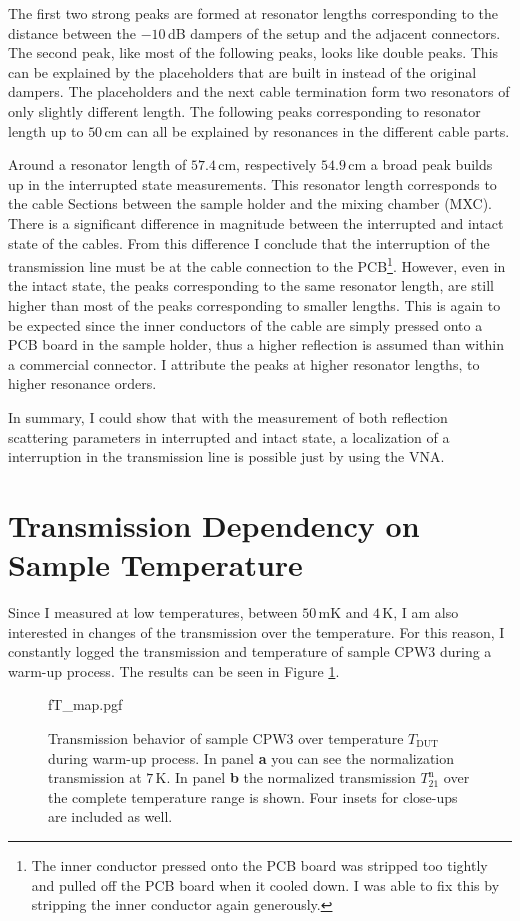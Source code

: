 The first two strong peaks are formed at resonator lengths corresponding to the distance between the $-10\,$dB dampers of the setup and the adjacent connectors. The second peak, like most of the following peaks, looks like double peaks. This can be explained by the placeholders that are built in instead of the original dampers. The placeholders and the next cable termination form two resonators of only slightly different length. The following peaks corresponding to resonator length up to $50\,$cm can all be explained by resonances in the different cable parts.

Around a resonator length of $57.4\,$cm, respectively $54.9\,$cm a broad peak builds up in the interrupted state measurements. This resonator length corresponds to the cable Sections between the sample holder and the mixing chamber (MXC). There is a significant difference in magnitude between the interrupted and intact state of the cables. From this difference I conclude that the interruption of the transmission line must be at the cable connection to the PCB\footnote{The inner conductor pressed onto the PCB board was stripped too tightly and pulled off the PCB board when it cooled down. I was able to fix this by stripping the inner conductor again generously.}. However, even in the intact state, the peaks corresponding to the same resonator length, are still higher than most of the peaks corresponding to smaller lengths. This is again to be expected since the inner conductors of the cable are simply pressed onto a PCB board in the sample holder, thus a higher reflection is assumed than within a commercial connector.
I attribute the peaks at higher resonator lengths, to higher resonance orders. 

In summary, I could show that with the measurement of both reflection scattering parameters in interrupted and intact state, a localization of a interruption in the transmission line is possible just by using the VNA.

\section{Transmission Dependency on Sample Temperature} \label{sec:analysis_fT_map}
Since I measured at low temperatures, between $50\,$mK and $4\,$K, I am also interested in changes of the transmission over the temperature. For this reason, I constantly logged the transmission and temperature of sample CPW3 during a warm-up process. The results can be seen in Figure \ref{fig:analysis_fT_map}.
\begin{figure}
    \centering
    {fT_map.pgf}
    \caption[Transmission behavior of sample CPW3 over temperature during warm-up]{Transmission behavior of sample CPW3 over temperature $T_\text{DUT}$ during warm-up process. In panel \textbf{\color{antiseeblau100}a} you can see the normalization transmission at $7\,$K. In panel \textbf{\color{antiseeblau100}b} the normalized transmission $T_{21}^\text{n}$ over the complete temperature range is shown. Four insets for close-ups are included as well.}
    \label{fig:analysis_fT_map}
\end{figure}

